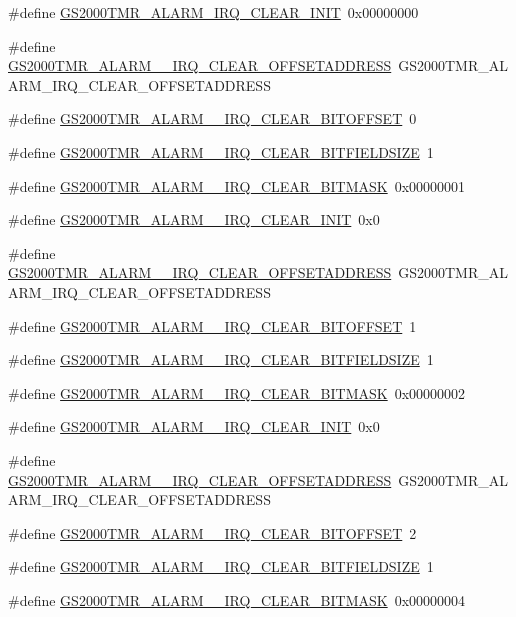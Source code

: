 \begin{DoxyCompactItemize}
\#define \hyperlink{a00556_ac3da3937cb943a72d8a73fe44b67bde6}{GS2000TMR\_\-ALARM\_\-IRQ\_\-CLEAR\_\-INIT}~0x00000000
\item 
\#define \hyperlink{a00556_a6b3a31fbf6bae2c011cb47cb2bdbe408}{GS2000TMR\_\-ALARM\_\_\-IRQ\_\-CLEAR\_\-OFFSETADDRESS}~GS2000TMR\_\-ALARM\_\-IRQ\_\-CLEAR\_\-OFFSETADDRESS
\item 
\#define \hyperlink{a00556_ad63dba3cc358c140a3fce691ef21157c}{GS2000TMR\_\-ALARM\_\_\-IRQ\_\-CLEAR\_\-BITOFFSET}~0
\item 
\#define \hyperlink{a00556_a055e2c6f67868a8361a6cf498e37cb25}{GS2000TMR\_\-ALARM\_\_\-IRQ\_\-CLEAR\_\-BITFIELDSIZE}~1
\item 
\#define \hyperlink{a00556_adcd25a3766b22fe6c53ebcc5ee17b4a6}{GS2000TMR\_\-ALARM\_\_\-IRQ\_\-CLEAR\_\-BITMASK}~0x00000001
\item 
\#define \hyperlink{a00556_a1253b018d5b2bfd5a9806c79848888d6}{GS2000TMR\_\-ALARM\_\_\-IRQ\_\-CLEAR\_\-INIT}~0x0
\item 
\#define \hyperlink{a00556_a704b3f8852dd352533a8d06db62b7064}{GS2000TMR\_\-ALARM\_\_\-IRQ\_\-CLEAR\_\-OFFSETADDRESS}~GS2000TMR\_\-ALARM\_\-IRQ\_\-CLEAR\_\-OFFSETADDRESS
\item 
\#define \hyperlink{a00556_a4a60456a961b8c18c506bcada7b8a062}{GS2000TMR\_\-ALARM\_\_\-IRQ\_\-CLEAR\_\-BITOFFSET}~1
\item 
\#define \hyperlink{a00556_aa27c82ebf6b6c152ca8306a8575b59a4}{GS2000TMR\_\-ALARM\_\_\-IRQ\_\-CLEAR\_\-BITFIELDSIZE}~1
\item 
\#define \hyperlink{a00556_ae71070ef62d5d923f0f9ef9a2e4ec6da}{GS2000TMR\_\-ALARM\_\_\-IRQ\_\-CLEAR\_\-BITMASK}~0x00000002
\item 
\#define \hyperlink{a00556_a0e02d05c75bc0cc57ef0a02fb58c2d59}{GS2000TMR\_\-ALARM\_\_\-IRQ\_\-CLEAR\_\-INIT}~0x0
\item 
\#define \hyperlink{a00556_ae972db05f8019c48e61c266e9d0b5703}{GS2000TMR\_\-ALARM\_\_\-IRQ\_\-CLEAR\_\-OFFSETADDRESS}~GS2000TMR\_\-ALARM\_\-IRQ\_\-CLEAR\_\-OFFSETADDRESS
\item 
\#define \hyperlink{a00556_a0d11a912885c4577eb04f28af1c179bc}{GS2000TMR\_\-ALARM\_\_\-IRQ\_\-CLEAR\_\-BITOFFSET}~2
\item 
\#define \hyperlink{a00556_a5769b1c6db19e01ce1fe5405b3ab7de3}{GS2000TMR\_\-ALARM\_\_\-IRQ\_\-CLEAR\_\-BITFIELDSIZE}~1
\item 
\#define \hyperlink{a00556_a6f16c1dda7458420d79bc7e4e68b1a25}{GS2000TMR\_\-ALARM\_\_\-IRQ\_\-CLEAR\_\-BITMASK}~0x00000004

\end{DoxyCompactItemize}
